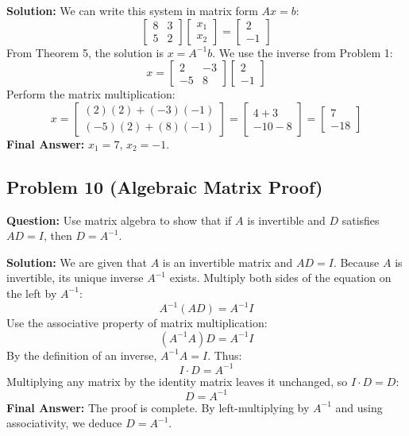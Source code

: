 \documentclass[12pt]{article}
\begin{document}
\textbf{Solution:}
We can write this system in matrix form $Ax = b$:
\[ \begin{bmatrix} 8 & 3 \\ 5 & 2 \end{bmatrix} \begin{bmatrix} x_1 \\ x_2 \end{bmatrix} = \begin{bmatrix} 2 \\ -1 \end{bmatrix} \]
From Theorem 5, the solution is $x = A^{-1}b$. We use the inverse from Problem 1:
\[ x = \begin{bmatrix} 2 & -3 \\ -5 & 8 \end{bmatrix} \begin{bmatrix} 2 \\ -1 \end{bmatrix} \]
Perform the matrix multiplication:
\[ x = \begin{bmatrix} (2)(2) + (-3)(-1) \\ (-5)(2) + (8)(-1) \end{bmatrix} = \begin{bmatrix} 4 + 3 \\ -10 - 8 \end{bmatrix} = \begin{bmatrix} 7 \\ -18 \end{bmatrix} \]
\textbf{Final Answer:} $x_1 = 7$, $x_2 = -1$.

\subsection{Problem 10 (Algebraic Matrix Proof)}
\textbf{Question:} Use matrix algebra to show that if $A$ is invertible and $D$ satisfies $AD = I$, then $D = A^{-1}$.

\textbf{Solution:}
We are given that $A$ is an invertible matrix and $AD = I$. Because $A$ is invertible, its unique inverse $A^{-1}$ exists.
Multiply both sides of the equation on the left by $A^{-1}$:
\[ A^{-1}(AD) = A^{-1}I \]
Use the associative property of matrix multiplication:
\[ (A^{-1}A)D = A^{-1}I \]
By the definition of an inverse, $A^{-1}A = I$. Thus:
\[ I \cdot D = A^{-1} \]
Multiplying any matrix by the identity matrix leaves it unchanged, so $I \cdot D = D$:
\[ D = A^{-1} \]
\textbf{Final Answer:} The proof is complete. By left-multiplying by $A^{-1}$ and using associativity, we deduce $D = A^{-1}$.
\end{document}
